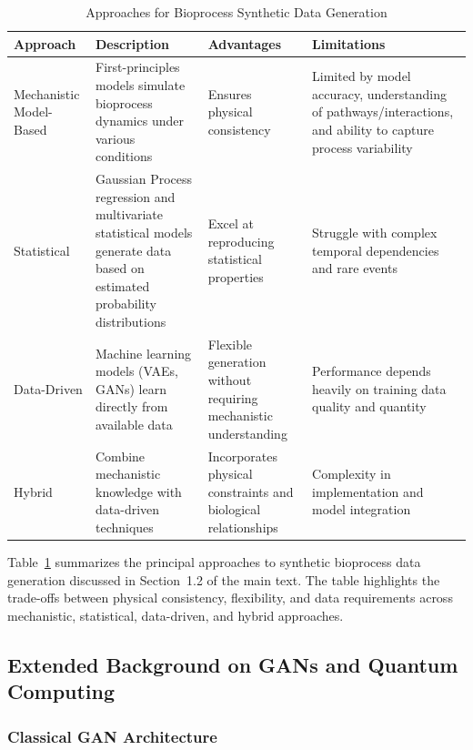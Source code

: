 \begin{table}
\footnotesize
 \caption{Approaches for Bioprocess Synthetic Data Generation}
 \label{tbl:bioprocess_methods}
 \begin{tabularx}{\textwidth}{@{}lXXX@{}}
 \toprule
 \textbf{Approach} & \textbf{Description} & \textbf{Advantages} & \textbf{Limitations}\\
 \midrule
 Mechanistic Model-Based & 
 First-principles models simulate bioprocess dynamics under various conditions \cite{vidossich2021role, banga2025mechanistic} & 
 Ensures physical consistency & 
 Limited by model accuracy, understanding of pathways/interactions, and ability to capture process variability \\
 \midrule
 Statistical & 
 Gaussian Process regression and multivariate statistical models generate data based on estimated probability distributions \cite{kim2023, miletic2025utility} & 
 Excel at reproducing statistical properties & 
 Struggle with complex temporal dependencies and rare events \\
 \midrule
 Data-Driven & 
 Machine learning models (VAEs, GANs) learn directly from available data \cite{goodfellow2014generativeadversarialnetworks, akkem2024comprehensive} & 
 Flexible generation without requiring mechanistic understanding & 
 Performance depends heavily on training data quality and quantity \\
 \midrule
 Hybrid & 
 Combine mechanistic knowledge with data-driven techniques \cite{albino2024hybridmodel} & 
 Incorporates physical constraints and biological relationships & 
 Complexity in implementation and model integration \\
 \bottomrule
 \end{tabularx}
\end{table}

Table~\ref{tbl:bioprocess_methods} summarizes the principal approaches to synthetic bioprocess data generation
discussed in Section~1.2 of the main text. The table highlights the trade-offs between
physical consistency, flexibility, and data requirements across mechanistic, statistical,
data-driven, and hybrid approaches.

\subsection{Extended Background on GANs and Quantum Computing}

 \subsubsection{Classical GAN Architecture}

